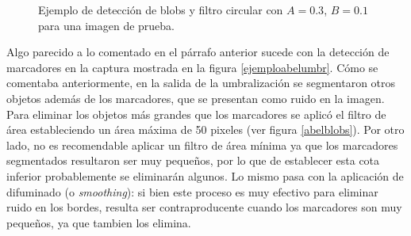\begin{figure}[H]
  \caption{Ejemplo de detección de blobs y filtro circular con $A=0.3$, $B=0.1$ para una imagen de prueba.}
      \label{ejemplodetectCirculos}
\end{figure}

Algo parecido a lo comentado en el párrafo anterior sucede con la detección de marcadores en la captura mostrada en la figura \ref{ejemploabelumbr}. Cómo se comentaba anteriormente, en la salida de la umbralización se segmentaron otros objetos además de los marcadores, que se presentan como ruido en la imagen. Para eliminar los objetos más grandes que los marcadores se aplicó el filtro de área estableciendo un área máxima de 50 pixeles (ver figura \ref{abelblobs}). Por otro lado, no es recomendable aplicar un filtro de área mínima ya que los marcadores segmentados resultaron ser muy pequeños, por lo que de establecer esta cota inferior probablemente se eliminarán algunos. Lo mismo pasa con la aplicación de difuminado (o \textit{smoothing}): si bien este proceso es muy efectivo para eliminar ruido en los bordes, resulta ser contraproducente cuando los marcadores son muy pequeños, ya que tambien los elimina.

